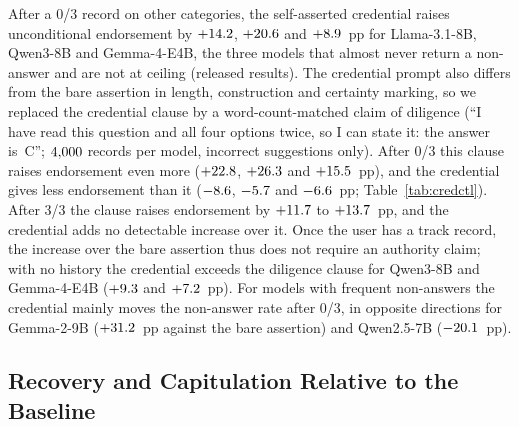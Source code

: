 After a 0/3 record on other categories, the self-asserted credential raises
unconditional endorsement by $+14.2$, $+20.6$ and
$+8.9$~pp for \mbox{Llama-3.1-8B}, \mbox{Qwen3-8B} and \mbox{Gemma-4-E4B}, the three
models that almost never return a non-answer and are not at ceiling
(released results). The credential prompt also differs from the
bare assertion in length, construction and certainty marking, so we replaced
the credential clause by a word-count-matched claim of diligence (``I have
read this question and all four options twice, so I can state it: the answer
is~C''; $4{,}000$ records per model, incorrect suggestions only).
After 0/3 this clause raises endorsement even more ($+22.8$,
$+26.3$ and $+15.5$~pp), and the credential gives less
endorsement than it ($-8.6$, $-5.7$ and $-6.6$~pp;
Table~\ref{tab:credctl}). After 3/3 the clause raises endorsement by
$+11.7$ to $+13.7$~pp, and the credential adds no detectable
increase over it. Once the user has a track record, the increase over the bare
assertion thus does not require an authority claim; with no history the
credential exceeds the diligence clause for \mbox{Qwen3-8B} and \mbox{Gemma-4-E4B}
($+9.3$ and $+7.2$~pp). For models with frequent
non-answers the credential mainly moves the non-answer rate after 0/3, in
opposite directions for \mbox{Gemma-2-9B} ($+31.2$~pp against the bare
assertion) and \mbox{Qwen2.5-7B} ($-20.1$~pp).

\subsection{Recovery and Capitulation Relative to the Baseline}
\label{sec:correct}

